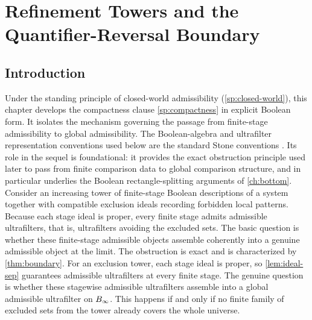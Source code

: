 \chapter{Refinement Towers and the Quantifier-Reversal Boundary}
\label{ch:foundation}
\begin{chapterorientation}
\end{chapterorientation}
\section{Introduction}
Under the standing principle of closed-world admissibility
(\cref{sp:closed-world}), this chapter develops the compactness clause
\cref{sp:compactness} in explicit Boolean form.
It isolates the mechanism governing the passage from finite-stage
admissibility to global admissibility.
The Boolean-algebra and ultrafilter representation conventions used
below are the standard Stone conventions \cite{Stone1936}.
Its role in the sequel is foundational: it provides the exact
obstruction principle used later to pass from finite comparison data to
global comparison structure, and in particular underlies the Boolean
rectangle-splitting arguments of \cref{ch:bottom}.
Consider an increasing tower of finite-stage Boolean descriptions of a
system together with compatible exclusion ideals recording forbidden
local patterns. Because each stage ideal is proper, every finite stage
admits admissible ultrafilters, that is, ultrafilters avoiding the
excluded sets. The basic question is whether these finite-stage
admissible objects assemble coherently into a genuine admissible object
at the limit.
The obstruction is exact and is characterized by \cref{thm:boundary}.
For an exclusion tower, each stage ideal is proper, so
\cref{lem:ideal-sep} guarantees admissible ultrafilters at every
finite stage. The genuine question is whether these stagewise
admissible ultrafilters assemble into a global admissible ultrafilter
on \(B_\infty\). This happens if and only if no finite family of
excluded sets from the tower already covers the whole universe.

